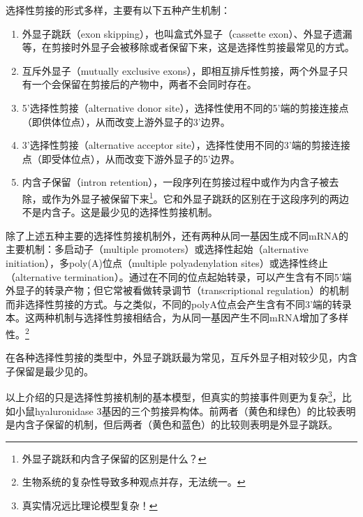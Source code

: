 \documentclass[11pt,a4paper,twoside]{book}
\begin{document}
选择性剪接的形式多样，主要有以下五种产生机制：
\begin{enumerate}
  \item 外显子跳跃（exon skipping），也叫盒式外显子（cassette exon）、外显子遗漏等，在剪接时外显子会被移除或者保留下来，这是选择性剪接最常见的方式。
  \item 互斥外显子（mutually exclusive exons），即相互排斥性剪接，两个外显子只有一个会保留在剪接后的产物中，两者不会同时存在。
  \item 5'选择性剪接（alternative donor site），选择性使用不同的5'端的剪接连接点（即供体位点），从而改变上游外显子的3'边界。
  \item 3'选择性剪接（alternative acceptor site），选择性使用不同的3'端的剪接连接点（即受体位点），从而改变下游外显子的5'边界。
  \item 内含子保留（intron retention），一段序列在剪接过程中或作为内含子被去除，或作为外显子被保留下来\footnote{外显子跳跃和内含子保留的区别是什么？}。它和外显子跳跃的区别在于这段序列的两边不是内含子。这是最少见的选择性剪接机制。
\end{enumerate}

除了上述五种主要的选择性剪接机制外，还有两种从同一基因生成不同mRNA的主要机制：多启动子（multiple promoters）或选择性起始（alternative initiation），多poly(A)位点（multiple polyadenylation sites）或选择性终止（alternative termination）。通过在不同的位点起始转录，可以产生含有不同5'端外显子的转录产物；但它常被看做转录调节（transcriptional regulation）的机制而非选择性剪接的方式。与之类似，不同的polyA位点会产生含有不同3'端的转录本。这两种机制与选择性剪接相结合，为从同一基因产生不同mRNA增加了多样性。\footnote{生物系统的复杂性导致多种观点并存，无法统一。}

在各种选择性剪接的类型中，外显子跳跃最为常见，互斥外显子相对较少见，内含子保留是最少见的。

以上介绍的只是选择性剪接机制的基本模型，但真实的剪接事件则更为复杂\footnote{真实情况远比理论模型复杂！}，比如小鼠hyaluronidase 3基因的三个剪接异构体。前两者（黄色和绿色）的比较表明是内含子保留的机制，但后两者（黄色和蓝色）的比较则表明是外显子跳跃。
\end{document}
